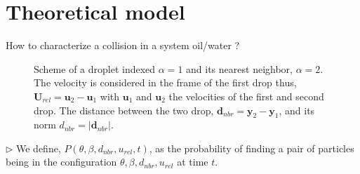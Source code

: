 \documentclass{sintefbeamer}
\begin{document}
\section*{Theoretical model}
\begin{frame}{How to characterize a collision in a system oil/water ?}
\begin{figure}[h!]
  \centering
  \caption{Scheme of a droplet indexed $\alpha =1$ and its nearest neighbor, $\alpha = 2$. The velocity is considered in the frame of the first drop thus, $\bm{U}_{rel} =  \bm{u}_2-\bm{u}_1$ with $\bm{u}_1$ and $\bm{u}_2$ the velocities of the first and second drop. The distance between the two drop, $\bm{d}_{nbr} = \bm{y}_2 -\bm{y}_1$, and its norm $d_{nbr} = |\bm{d}_{nbr}|$. }
\end{figure}
$\triangleright$ We define, $P(\theta,\beta,d_{nbr},u_{rel},t)$, as the probability of finding a pair of particles being in the configuration $\theta,\beta,d_{nbr},u_{rel}$ at time $t$.
\end{frame}
\end{document}
